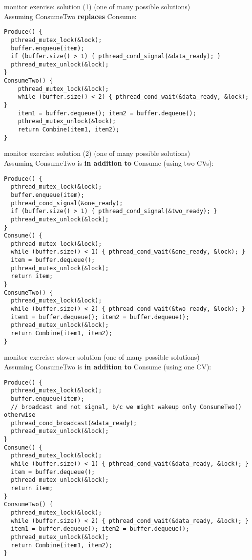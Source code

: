 \iftoggle{heldback}{\excludecomment{isheldback}}{\includecomment{isheldback}}
\begin{isheldback}
\begin{frame}[fragile,label=monitorExerciseSln]{monitor exercise: solution (1)}
\small (one of many possible solutions) \\
Assuming ConsumeTwo \textbf{replaces} Consume:
\begin{lstlisting}[basicstyle=\tt\fontsize{9.5}{10.5}\selectfont]
Produce() {
  pthread_mutex_lock(&lock);
  buffer.enqueue(item);
  if (buffer.size() > 1) { pthread_cond_signal(&data_ready); }
  pthread_mutex_unlock(&lock);
}
ConsumeTwo() {
    pthread_mutex_lock(&lock);
    while (buffer.size() < 2) { pthread_cond_wait(&data_ready, &lock); }
    item1 = buffer.dequeue(); item2 = buffer.dequeue();
    pthread_mutex_unlock(&lock);
    return Combine(item1, item2);
}
\end{lstlisting}
\end{frame}

\begin{frame}[fragile,label=monitorExerciseSln2]{monitor exercise: solution (2)}
\small (one of many possible solutions) \\
Assuming ConsumeTwo is \textbf{in addition to} Consume (using two CVs):
\begin{lstlisting}[basicstyle=\tt\fontsize{9}{10}\selectfont]
Produce() {
  pthread_mutex_lock(&lock);
  buffer.enqueue(item);
  pthread_cond_signal(&one_ready);
  if (buffer.size() > 1) { pthread_cond_signal(&two_ready); }
  pthread_mutex_unlock(&lock);
}
Consume() {
  pthread_mutex_lock(&lock);
  while (buffer.size() < 1) { pthread_cond_wait(&one_ready, &lock); }
  item = buffer.dequeue();
  pthread_mutex_unlock(&lock);
  return item;
}
ConsumeTwo() {
  pthread_mutex_lock(&lock);
  while (buffer.size() < 2) { pthread_cond_wait(&two_ready, &lock); }
  item1 = buffer.dequeue(); item2 = buffer.dequeue();
  pthread_mutex_unlock(&lock);
  return Combine(item1, item2);
}
\end{lstlisting}
\end{frame}

\begin{frame}[fragile,label=monitorExerciseSln3]{monitor exercise: slower solution}
\small (one of many possible solutions) \\
Assuming ConsumeTwo is \textbf{in addition to} Consume (using one CV):
\begin{lstlisting}[basicstyle=\tt\fontsize{9}{10}\selectfont]
Produce() {
  pthread_mutex_lock(&lock);
  buffer.enqueue(item);
  // broadcast and not signal, b/c we might wakeup only ConsumeTwo() otherwise
  pthread_cond_broadcast(&data_ready);
  pthread_mutex_unlock(&lock);
}
Consume() {
  pthread_mutex_lock(&lock);
  while (buffer.size() < 1) { pthread_cond_wait(&data_ready, &lock); }
  item = buffer.dequeue();
  pthread_mutex_unlock(&lock);
  return item;
}
ConsumeTwo() {
  pthread_mutex_lock(&lock);
  while (buffer.size() < 2) { pthread_cond_wait(&data_ready, &lock); }
  item1 = buffer.dequeue(); item2 = buffer.dequeue();
  pthread_mutex_unlock(&lock);
  return Combine(item1, item2);
}
\end{lstlisting}
\end{frame}
\end{isheldback}
